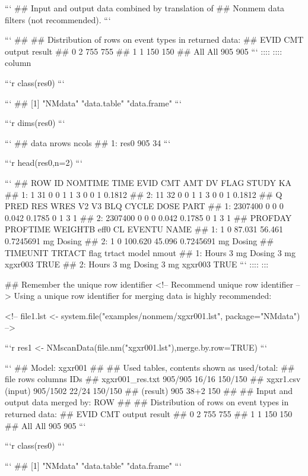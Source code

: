 ```
## Input and output data combined by translation of
## Nonmem data filters (not recommended).
```

```
## 
## Distribution of rows on event types in returned data:
##  EVID CMT output result
##     0   2    755    755
##     1   1    150    150
##   All All    905    905
```
::::
\pause
:::: column

```r
class(res0)
```

```
## [1] "NMdata"     "data.table" "data.frame"
```

```r
dims(res0)
```

```
##    data nrows ncols
## 1: res0   905    34
```

```r
head(res0,n=2)
```

```
##    ROW ID NOMTIME TIME EVID CMT AMT DV FLAG STUDY     KA
## 1:   1 31       0    0    1   1   3  0    0     1 0.1812
## 2:  11 32       0    0    1   1   3  0    0     1 0.1812
##          Q PRED RES WRES    V2     V3 BLQ CYCLE DOSE PART
## 1: 2307400    0   0    0 0.042 0.1785   0     1    3    1
## 2: 2307400    0   0    0 0.042 0.1785   0     1    3    1
##    PROFDAY PROFTIME WEIGHTB   eff0        CL EVENTU   NAME
## 1:       1        0  87.031 56.461 0.7245691     mg Dosing
## 2:       1        0 100.620 45.096 0.7245691     mg Dosing
##    TIMEUNIT TRTACT   flag trtact   model nmout
## 1:    Hours   3 mg Dosing   3 mg xgxr003  TRUE
## 2:    Hours   3 mg Dosing   3 mg xgxr003  TRUE
```
\normalsize
::::
:::

## Remember the unique row identifier
<!-- Recommend unique row identifier -->
Using a unique row identifier for merging data is highly recommended:

\footnotesize
<!-- file1.lst <- system.file("examples/nonmem/xgxr001.lst", package="NMdata") -->

```r
res1 <- NMscanData(file.nm("xgxr001.lst"),merge.by.row=TRUE)
```

```
## Model:  xgxr001 
## 
## Used tables, contents shown as used/total:
##               file     rows columns     IDs
##    xgxr001_res.txt  905/905   16/16 150/150
##  xgxr1.csv (input) 905/1502   22/24 150/150
##           (result)      905    38+2     150
## 
## Input and output data merged by: ROW 
## 
## Distribution of rows on event types in returned data:
##  EVID CMT output result
##     0   2    755    755
##     1   1    150    150
##   All All    905    905
```

```r
class(res0)
```

```
## [1] "NMdata"     "data.table" "data.frame"
```
\normalsize

